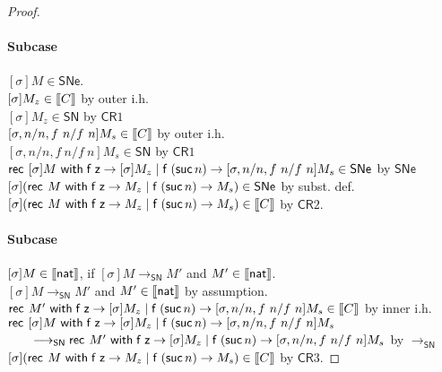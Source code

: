 \documentclass{article}
\makeatletter
\newtheorem{exercise}{Exercise}[section]
\newtheorem{@problem}{Exercise}[section]
\newenvironment{problem}{\begin{@problem}\rm}{\end{@problem}}
\newcommand{\SN}{\mathsf{SN}}
\newcommand{\SNe}{\mathsf{SNe}}
\newcommand{\csn}{\mathsf{sn}}
\newcommand{\CR}{\mathsf{CR}}
\newcommand{\red}{\longrightarrow}
\newcommand{\redSN}{\longrightarrow_\SN}
\def\lv{\mathopen{{[\kern-0.14em[}}}    %
\def\rv{\mathclose{{]\kern-0.14em]}}}   %
\newcommand{\den}[1]{\lv #1 \rv}
\makeatother
\begin{document}
\begin{proof}
 \paragraph{Subcase } $[\sigma]M \in \SNe$. \\
 $[\sigma]M_z \in \den{C}$ \hfill by outer i.h.\\
 $[\sigma]M_z \in \SN$ \hfill by $\CR1$\\
 $[\sigma, n/n, f~n/f~n]M_s \in \den{C}$ \hfill by outer i.h. \\
 $[\sigma, n/n, f~n/f~n]M_s \in \SN$ \hfill by $\CR1$ \\
 $\recnat{[\sigma]M}{[\sigma]M_z}{[\sigma, n/n, f~n/f~n]M_s} \in \SNe$ \hfill by $\SNe$\\
$[\sigma](\recnat{M}{M_z}{M_s}) \in \SNe$ \hfill by subst. def. \\
$[\sigma](\recnat{M}{M_z}{M_s}) \in \den{C}$ \hfill by $\CR2$.


 \paragraph{Subcase } $[\sigma]M \in \den{\nat}$, if $[\sigma]M \redSN M'$ and
 $M' \in \den{\nat}$.\\
 $[\sigma]M \redSN M'$ and $M' \in \den{\nat}$ \hfill by assumption.\\
 $\recnat{M'}{[\sigma]M_z}{[\sigma,n/n, f~n/f~n]M_s} \in \den{C}$ \hfill by inner i.h. \\ 
 $\mathsf{rec}^{}~[\sigma]M~\mathsf{with}\;{\mathsf{f}}\;\mathsf{z} \rightarrow [\sigma]M_z \mid {\mathsf{f}}\;({\mathsf{suc}}\, n) \rightarrow {[\sigma,n/n, f~n/f~n]M_s}$ \\
 $\qquad \redSN \recnat{M'}{[\sigma]M_z}{[\sigma,n/n, f~n/f~n]M_s}$ \hfill by $\redSN$\\
 $[\sigma](\recnat{M}{M_z}{M_s}) \in \den{C}$ \hfill by $\CR3$.


 \end{proof}



\end{document}

